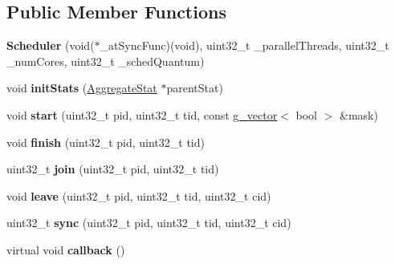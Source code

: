 \subsection*{Public Member Functions}
\begin{DoxyCompactItemize}
\item 
\hypertarget{classScheduler_a678fa728dd18dc9682bda160eefc71b7}{{\bfseries Scheduler} (void($\ast$\-\_\-at\-Sync\-Func)(void), uint32\-\_\-t \-\_\-parallel\-Threads, uint32\-\_\-t \-\_\-num\-Cores, uint32\-\_\-t \-\_\-sched\-Quantum)}\label{classScheduler_a678fa728dd18dc9682bda160eefc71b7}

\item 
\hypertarget{classScheduler_a3b3f1c768e104463ee975cb6543c59f9}{void {\bfseries init\-Stats} (\hyperlink{classAggregateStat}{Aggregate\-Stat} $\ast$parent\-Stat)}\label{classScheduler_a3b3f1c768e104463ee975cb6543c59f9}

\item 
\hypertarget{classScheduler_ada122eeb910e25f1175acb6d2cbe83d9}{void {\bfseries start} (uint32\-\_\-t pid, uint32\-\_\-t tid, const \hyperlink{classg__vector}{g\-\_\-vector}$<$ bool $>$ \&mask)}\label{classScheduler_ada122eeb910e25f1175acb6d2cbe83d9}

\item 
\hypertarget{classScheduler_a8f7a249370a940ced83b4515d77d7d2d}{void {\bfseries finish} (uint32\-\_\-t pid, uint32\-\_\-t tid)}\label{classScheduler_a8f7a249370a940ced83b4515d77d7d2d}

\item 
\hypertarget{classScheduler_a619b5b66a36bd8bb67cb61eabbceffa5}{uint32\-\_\-t {\bfseries join} (uint32\-\_\-t pid, uint32\-\_\-t tid)}\label{classScheduler_a619b5b66a36bd8bb67cb61eabbceffa5}

\item 
\hypertarget{classScheduler_af07c3a060dc6526314293e50d742e8e1}{void {\bfseries leave} (uint32\-\_\-t pid, uint32\-\_\-t tid, uint32\-\_\-t cid)}\label{classScheduler_af07c3a060dc6526314293e50d742e8e1}

\item 
\hypertarget{classScheduler_ac44185577c19d4afc2d592696550a7d8}{uint32\-\_\-t {\bfseries sync} (uint32\-\_\-t pid, uint32\-\_\-t tid, uint32\-\_\-t cid)}\label{classScheduler_ac44185577c19d4afc2d592696550a7d8}

\item 
\hypertarget{classScheduler_abdfd882aca8d4d3cdbe7cc2c0161a1ff}{virtual void {\bfseries callback} ()}\label{classScheduler_abdfd882aca8d4d3cdbe7cc2c0161a1ff}


\end{DoxyCompactItemize}
